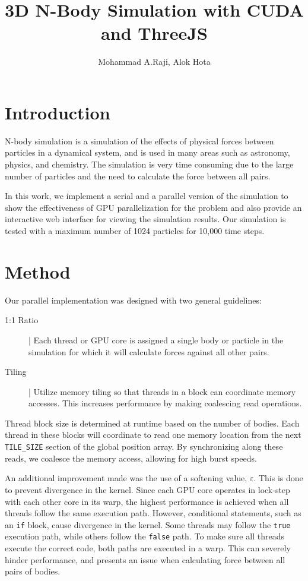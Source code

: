 \documentclass[10pt,a4paper]{article}
\author{Mohammad A.Raji, Alok Hota}
\title{3D N-Body Simulation with CUDA and ThreeJS}
\begin{document}
	\maketitle
	
	\section{Introduction}
	N-body simulation is a simulation of the effects of physical forces between particles in a dynamical system, and is used in many areas such as astronomy, physics, and chemistry. The simulation is very time consuming due to the large number of particles and the need to calculate the force between all pairs. 
	
	In this work, we implement a serial and a parallel version of the simulation to show the effectiveness of GPU parallelization for the problem and also provide an interactive web interface for viewing the simulation results. Our simulation is tested with a maximum number of 1024 particles for 10,000 time steps. 
	
	\section{Method}
	Our parallel implementation was designed with two general guidelines:
	\begin{description}
		\item[1:1 Ratio] | Each thread or GPU core is assigned a single body or particle in the simulation for which it will calculate forces against all other pairs.
		\item[Tiling] | Utilize memory tiling so that threads in a block can coordinate memory accesses. This increases performance by making coalescing read operations.
	\end{description}
	Thread block size is determined at runtime based on the number of bodies. Each thread in these blocks will coordinate to read one memory location from the next \texttt{TILE\_SIZE} section of the global position array. By synchronizing along these reads, we coalesce the memory access, allowing for high burst speeds.
	
	An additional improvement made was the use of a softening value, $\varepsilon$. This is done to prevent divergence in the kernel. Since each GPU core operates in lock-step with each other core in its warp, the highest performance is achieved when all threads follow the same execution path. However, conditional statements, such as an \texttt{if} block, cause divergence in the kernel. Some threads may follow the \texttt{true} execution path, while others follow the \texttt{false} path. To make sure all threads execute the correct code, both paths are executed in a warp. This can severely hinder performance, and presents an issue when calculating force between all pairs of bodies.
	
\end{document}

